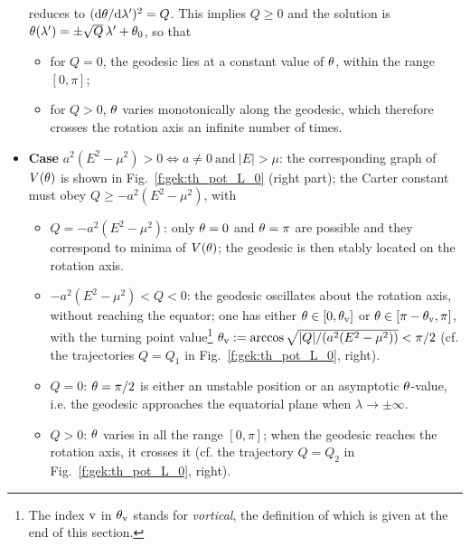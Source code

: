 \begin{itemize}
reduces to $(\mathrm{d}\theta/\mathrm{d}\lambda')^2 = Q$. This implies $Q\geq 0$
and the solution is $\theta(\lambda') = \pm \sqrt{Q}\, \lambda' + \theta_0$,
so that
\begin{itemize}
\item for $Q=0$, the geodesic lies at a constant value of $\theta$, within the range
$[0,\pi]$;
\item for $Q>0$, $\theta$ varies monotonically along the geodesic, which
therefore crosses the rotation
axis an infinite number of times.
\end{itemize}
\item \textbf{Case} $a^2 (E^2 - \mu^2) > 0 \iff a\neq 0 \ \mbox{and}\  |E|>\mu$:
the corresponding graph of $V(\theta)$ is shown in
Fig.~\ref{f:gek:th_pot_L_0} (right part); the Carter constant must obey
$Q \geq - a^2 (E^2 - \mu^2)$, with
\begin{itemize}
\item $Q=-a^2(E^2 - \mu^2)$: only $\theta=0$ and
$\theta=\pi$ are possible and they correspond to minima of $V(\theta)$;
the geodesic is then stably located on the rotation axis.
\item $-a^2(E^2 - \mu^2) < Q < 0$: the geodesic oscillates about the rotation
axis, without reaching the equator; one has either $\theta\in[0,\theta_{\rm v}]$ or
$\theta\in [\pi - \theta_{\rm v},\pi]$, with the turning point value\footnote{The index ${\rm v}$
in $\theta_{\rm v}$ stands for \emph{vortical}, the definition of which is given at the end of this
section.}
$\theta_{\rm v} := \arccos\sqrt{|Q|/(a^2(E^2 - \mu^2))} < \pi/2$ (cf. the trajectories $Q=Q_1$ in Fig.~\ref{f:gek:th_pot_L_0}, right).
\item $Q=0$: $\theta=\pi/2$ is either an unstable position or
an asymptotic $\theta$-value, i.e. the geodesic approaches the equatorial
plane when $\lambda\to\pm\infty$.
\item $Q>0$: $\theta$ varies in all the range $[0,\pi]$; when
the geodesic reaches the rotation axis, it crosses it (cf. the trajectory $Q=Q_2$ in Fig.~\ref{f:gek:th_pot_L_0}, right).
\end{itemize}
\end{itemize}

